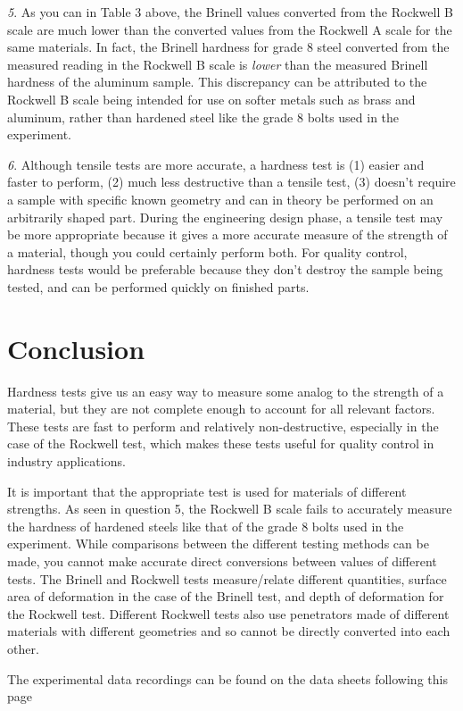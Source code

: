 \documentclass{article}
\begin{document}
\vspace{2em}
\textit{5}.
As you can in Table 3 above, the Brinell values converted from the Rockwell B scale are much lower than the converted values from the Rockwell A scale for the same materials. In fact, the Brinell hardness for grade 8 steel converted from the measured reading in the Rockwell B scale is \textit{lower} than the measured Brinell hardness of the aluminum sample. This discrepancy can be attributed to the Rockwell B scale being intended for use on softer metals such as brass and aluminum, rather than hardened steel like the grade 8 bolts used in the experiment.

\vspace{2em}
\textit{6}.
Although tensile tests are more accurate, a hardness test is (1) easier and faster to perform, (2) much less destructive than a tensile test, (3) doesn't require a sample with specific known geometry and can in theory be performed on an arbitrarily shaped part. During the engineering design phase, a tensile test may be more appropriate because it gives a more accurate measure of the strength of a material, though you could certainly perform both. For quality control, hardness tests would be preferable because they don't destroy  the sample being tested, and can be performed quickly on finished parts.

\section{Conclusion}

Hardness tests give us an easy way to measure some analog to the strength of a material, but they are not complete enough to account for all relevant factors. These tests are fast to perform and relatively non-destructive, especially in the case of the Rockwell test, which makes these tests useful for quality control in industry applications.

\vspace{.5em}
It is important that the appropriate test is used for materials of different strengths. As seen in question 5, the Rockwell B scale fails to accurately measure the hardness of hardened steels like that of the grade 8 bolts used in the experiment. While comparisons between the different testing methods can be made, you cannot make accurate direct conversions between values of different tests. The Brinell and Rockwell tests measure/relate different quantities, surface area of deformation in the case of the Brinell test, and depth of deformation for the Rockwell test. Different Rockwell tests also use penetrators made of different materials with different geometries and so cannot be directly converted into each other.

\vspace{3em}
The experimental data recordings can be found on the data sheets following this page
\end{document}
